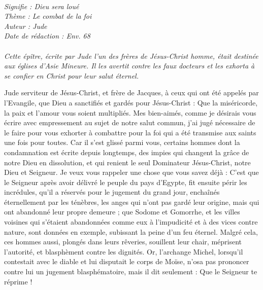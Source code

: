 \BFont
\noindent\hrulefill
{\footnotesize
\textit{
\bigskip
{\centering{}
\\Signifie : Dieu sera loué
\\Thème : Le combat de la foi
\\Auteur : Jude
\\Date de rédaction : Env. 68\\}
}
\textit{
\\Cette épître, écrite par Jude l’un des frères de Jésus-Christ homme, était destinée aux églises d’Asie Mineure. Il les avertit contre les faux docteurs et les exhorta à se confier en Christ pour leur salut éternel.\bigskip
}
}
\par\nobreak\noindent\hrulefill
\begin{multicols}{2}
\VerseOne{}Jude serviteur de Jésus-Christ, et frère de Jacques, à ceux qui ont été appelés par l'Evangile, que Dieu a sanctifiés et gardés pour Jésus-Christ :
Que la miséricorde, la paix et l'amour vous soient multipliés.
Mes bien-aimés, comme je désirais vous écrire avec empressement au sujet de notre salut commun, j’ai jugé nécessaire de le faire pour vous exhorter à combattre pour la foi qui a été transmise aux saints une fois pour toutes.
Car il s’est glissé parmi vous, certains hommes dont la condamnation est écrite depuis longtemps, des impies qui changent la grâce de notre Dieu en dissolution, et qui renient le seul Dominateur Jésus-Christ, notre Dieu et Seigneur.
Je veux vous rappeler une chose que vous savez déjà : C'est que le Seigneur après avoir délivré le peuple du pays d'Egypte, fit ensuite périr les incrédules,
qu’il a réservés pour le jugement du grand jour, enchaînés éternellement par les ténèbres, les anges qui n'ont pas gardé leur origine, mais qui ont abandonné leur propre demeure ;
que Sodome et Gomorrhe, et les villes voisines qui s'étaient abandonnées comme eux à l'impudicité et à des vices contre nature, sont données en exemple, subissant la peine d’un feu éternel.
Malgré cela, ces hommes aussi, plongés dans leurs rêveries, souillent leur chair, méprisent l’autorité, et blasphèment contre les dignités.
Or, l'archange Michel, lorsqu’il contestait avec le diable et lui disputait le corps de Moïse, n'osa pas prononcer contre lui un jugement blasphématoire, mais il dit seulement : Que le Seigneur te réprime !

\end{multicols}

